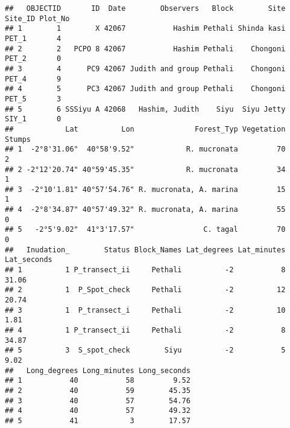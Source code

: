 \documentclass[
]{article}
\begin{document}
\begin{verbatim}
##   OBJECTID       ID  Date        Observers   Block        Site Site_ID Plot_No
## 1        1        X 42067           Hashim Pethali Shinda kasi   PET_1       4
## 2        2   PCPO 8 42067           Hashim Pethali    Chongoni   PET_2       0
## 3        4      PC9 42067 Judith and group Pethali    Chongoni   PET_4       9
## 4        5      PC3 42067 Judith and group Pethali    Chongoni   PET_5       3
## 5        6 SSSiyu A 42068   Hashim, Judith    Siyu  Siyu Jetty   SIY_1       0
##            Lat          Lon              Forest_Typ Vegetation Stumps
## 1  -2°8'31.06"  40°58'9.52"            R. mucronata         70      2
## 2 -2°12'20.74" 40°59'45.35"            R. mucronata         34      1
## 3  -2°10'1.81" 40°57'54.76" R. mucronata, A. marina         15      1
## 4  -2°8'34.87" 40°57'49.32" R. mucronata, A. marina         55      0
## 5   -2°5'9.02"  41°3'17.57"                C. tagal         70      0
##   Inudation_        Status Block_Names Lat_degrees Lat_minutes Lat_seconds
## 1          1 P_transect_ii     Pethali          -2           8       31.06
## 2          1  P_Spot_check     Pethali          -2          12       20.74
## 3          1  P_transect_i     Pethali          -2          10        1.81
## 4          1 P_transect_ii     Pethali          -2           8       34.87
## 5          3  S_spot_check        Siyu          -2           5        9.02
##   Long_degrees Long_minutes Long_seconds
## 1           40           58         9.52
## 2           40           59        45.35
## 3           40           57        54.76
## 4           40           57        49.32
## 5           41            3        17.57
\end{verbatim}
\end{document}
